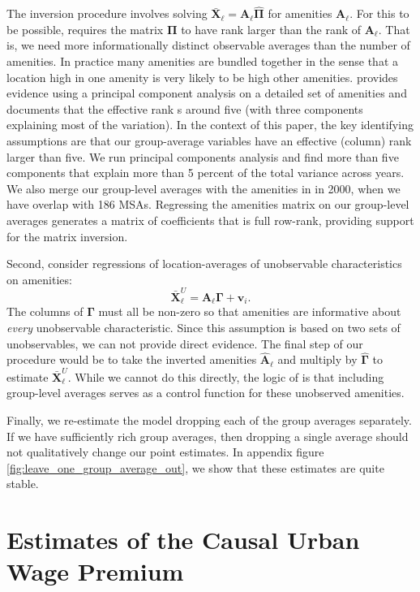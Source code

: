 \documentclass[12pt]{article}
\begin{document}
The inversion procedure involves solving $\bar{\bm{X}}_\ell = \bm{A}_\ell \hat{\bm{\Pi}}$ for amenities $\bm{A}_\ell$. 
For this to be possible, requires the matrix $\bm{\Pi}$ to have rank larger than the rank of $\bm{A}_\ell$. 
That is, we need more informationally distinct observable averages than the number of amenities. 
In practice many amenities are bundled together in the sense that a location high in one amenity is very likely to be high other amenities. 
\citet{Diamond_2016} provides evidence using a principal component analysis on a detailed set of amenities and documents that the effective rank s around five (with three components explaining most of the variation).
In the context of this paper, the key identifying assumptions are that our group-average variables have an effective (column) rank larger than five.
We run principal components analysis and find more than five components that explain more than 5 percent of the total variance across years.
We also merge our group-level averages with the amenities in \citet{Diamond_2016} in 2000, when we have overlap with 186 MSAs.
Regressing the amenities matrix on our group-level averages generates a matrix of coefficients that is full row-rank, providing support for the matrix inversion.

Second, consider regressions of location-averages of unobservable characteristics on amenities:
\begin{equation}\label{eq:unobservables_on_amenities}
    \bar{\bm{X}}_\ell^U = \bm{A}_\ell \bm{\Gamma} + \bm{v}_i.
\end{equation}
The columns of $\bm{\Gamma}$ must all be non-zero so that amenities are informative about \emph{every} unobservable characteristic. 
Since this assumption is based on two sets of unobservables, we can not provide direct evidence. 
The final step of our procedure would be to take the inverted amenities $\hat{\bm{A}}_\ell$ and multiply by $\hat{\bm{\Gamma}}$ to estimate $\bar{\bm{X}}_\ell^U$.
While we cannot do this directly, the logic of \citet{altonji2018estimating} is that including group-level averages serves as a control function for these unobserved amenities.

Finally, we re-estimate the model dropping each of the group averages separately.
If we have sufficiently rich group averages, then dropping a single average should not qualitatively change our point estimates. 
In appendix figure \ref{fig:leave_one_group_average_out}, we show that these estimates are quite stable.

\section{Estimates of the Causal Urban Wage Premium}
\end{document}

